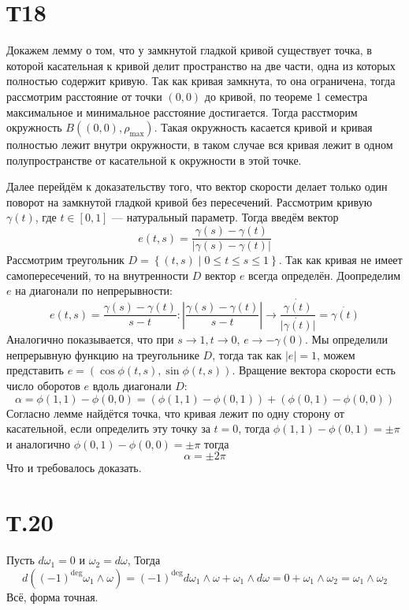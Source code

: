 \documentclass[12pt]{article}
\begin{document}
\section{Т18}
Докажем лемму о том, что у замкнутой гладкой кривой существует точка, в которой касательная к кривой делит 
пространство на две части, одна из которых полностью содержит кривую. 
Так как кривая замкнута, то она ограничена, тогда рассмотрим расстояние от точки $(0, 0)$ до кривой, по теореме 1 
семестра максимальное и минимальное расстояние достигается. Тогда расстморим окружность $B((0, 0), \rho_{\max})$. 
Такая окружность касается кривой и кривая полностью лежит внутри окружности, в таком случае вся кривая лежит в 
одном полупространстве от касательной к окружности в этой точке. 

Далее перейдём к доказательству того, что вектор скорости делает только один поворот на замкнутой гладкой кривой без 
пересечений. Рассмотрим кривую $\gamma(t)$, где $t \in [0, 1]$ --- натуральный параметр. Тогда введём вектор 
\[
    e(t, s) = \frac{\gamma(s) - \gamma(t)}{\vert \gamma(s) - \gamma(t) \vert}
\]   
Рассмотрим треугольник $D = \left\{ (t, s) \mid 0 \leq t \leq s \leq 1 \right\} $. Так как кривая не имеет 
самопересечений, то на внутренности $D$ вектор $e$ всегда определён. Доопределим $e$ на диагонали по непрерывности: 
\[
    e(t, s) = \frac{\gamma(s) - \gamma(t)}{s - t} : \left\vert \frac{\gamma(s) - \gamma(t)}{ s - t } \right\vert \to \frac{\dot{\gamma(t)}}{\vert \dot{\gamma(t)} \vert } = \dot{\gamma(t)}
\]    
Аналогично показывается, что при $s \to 1, t \to 0, \, e \to -\gamma(0)$. 
Мы определили непрерывную функцию на треугольнике $D$, тогда так как $\vert e \vert = 1$, можем представить 
$e = (\cos \phi(t, s), \sin \phi(t, s))$. Вращение вектора скорости есть число оборотов $e$ вдоль диагонали $D$:  
\[
    \alpha = \phi(1, 1) - \phi(0, 0) = (\phi(1, 1) - \phi(0, 1)) + (\phi(0, 1) - \phi(0, 0))
\]
Согласно лемме найдётся точка, что кривая лежит по одну сторону от касательной, если определить эту точку за $t = 0$, 
тогда $\phi(1, 1) - \phi(0, 1) = \pm \pi$ и аналогично $\phi(0, 1) - \phi(0, 0) = \pm \pi$ тогда 
\[
    \alpha = \pm 2\pi 
\]
Что и требовалось доказать.

\section{Т.20}
Пусть $d \omega_1 = 0$ и $\omega_2 = d \omega$, 
Тогда 
\[
    d( (-1)^{\text{deg}} \omega_1 \wedge \omega) = 
    (-1)^{\text{deg}} d \omega_1 \wedge \omega + \omega_1 \wedge d \omega = 0 + \omega_1 \wedge \omega_2 = \omega_1 \wedge \omega_2
\]
Всё, форма точная.
\end{document}
